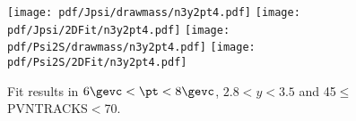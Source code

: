 \begin{figure}[H]
\begin{center}
\texttt{[image: pdf/Jpsi/drawmass/n3y2pt4.pdf]}
\texttt{[image: pdf/Jpsi/2DFit/n3y2pt4.pdf]}
\vspace*{-0.5cm}
\texttt{[image: pdf/Psi2S/drawmass/n3y2pt4.pdf]}
\texttt{[image: pdf/Psi2S/2DFit/n3y2pt4.pdf]}
\vspace*{-0.5cm}
\end{center}
\caption{Fit results in $6\gevc<\pt<8\gevc$, $2.8<y<3.5$ and 45$\leq$PVNTRACKS$<$70.}
\label{Fitn3y2pt4}
\end{figure}
